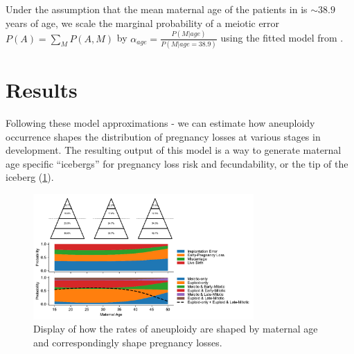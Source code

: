 \documentclass{article}
\begin{document}
Under the assumption that the mean maternal age of the patients in \citep{McCoy2023-dg} is $\sim 38.9$ years of age, we scale the marginal probability of a meiotic error $P(A) = \sum_M P(A,M)$ by $\alpha_{age} = \frac{P(M | age)}{P(M | age = 38.9)}$ using the fitted model from \citep{Gruhn2019-al}.

\section*{Results}

Following these model approximations - we can estimate how aneuploidy occurrence shapes the distribution of pregnancy losses at various stages in development. The resulting output of this model is a way to generate maternal age specific ``icebergs'' for pregnancy loss risk and fecundability, or the tip of the iceberg (\ref{fig:2}). 

\begin{figure}[H]
\begin{center}
    \includegraphics[width=0.75\textwidth]{figures/model_figure.042024.pdf}
\end{center}
\vspace{-1.5em}
\caption{Display of how the rates of aneuploidy are shaped by maternal age and correspondingly shape pregnancy losses.}
\label{fig:2}
\end{figure}



\end{document}
